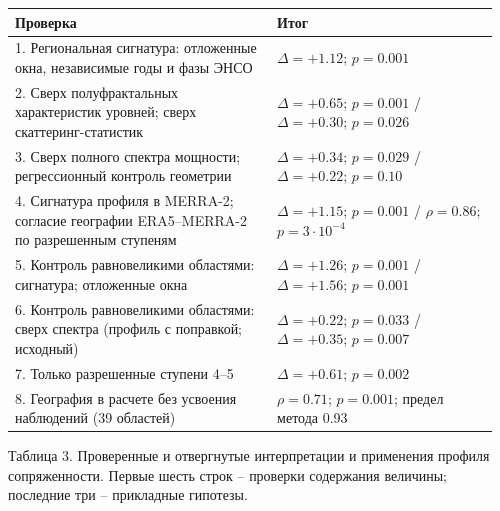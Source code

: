 \documentclass[12pt,a4paper]{article}
\begin{document}
\begin{singlespace}
\noindent\begin{tabular}{@{}p{0.52\linewidth}p{0.44\linewidth}@{}}
\toprule
Проверка & Итог\\
\midrule
1. Региональная сигнатура: отложенные окна, независимые годы и фазы ЭНСО & $\Delta = +1.12$; $p = 0.001$\\
2. Сверх полуфрактальных характеристик уровней; сверх скаттеринг-статистик & $\Delta = +0.65$; $p = 0.001$ / $\Delta = +0.30$; $p = 0.026$\\
3. Сверх полного спектра мощности; регрессионный контроль геометрии & $\Delta = +0.34$; $p = 0.029$ / $\Delta = +0.22$; $p = 0.10$\\
4. Сигнатура профиля в MERRA-2; согласие географии ERA5--MERRA-2 по разрешенным ступеням & $\Delta = +1.15$; $p = 0.001$ / $\rho = 0.86$; $p = 3 \cdot 10^{-4}$\\
5. Контроль равновеликими областями: сигнатура; отложенные окна & $\Delta = +1.26$; $p = 0.001$ / $\Delta = +1.56$; $p = 0.001$\\
6. Контроль равновеликими областями: сверх спектра (профиль с поправкой; исходный) & $\Delta = +0.22$; $p = 0.033$ / $\Delta = +0.35$; $p = 0.007$\\
7. Только разрешенные ступени 4--5 & $\Delta = +0.61$; $p = 0.002$\\
8. География в расчете без усвоения наблюдений (39 областей) & $\rho = 0.71$; $p = 0.001$; предел метода 0.93\\
\bottomrule
\end{tabular}
\end{singlespace}

\clearpage
\noindent Таблица 3. Проверенные и отвергнутые интерпретации и применения профиля сопряженности. Первые шесть строк -- проверки содержания величины; последние три -- прикладные гипотезы.
\end{document}

